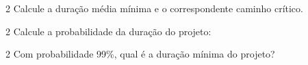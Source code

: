 \documentclass[\mainfilename]{subfiles}
\begin{document}
\begin{questionBox}
\begin{questionBox}
    \end{questionBox}

    \begin{questionBox}2{ %
        Calcule a duração média mínima e o correspondente caminho crítico.
    } %
    \end{questionBox}

    \begin{questionBox}2{ %
        Calcule a probabilidade da duração do projeto: 
    } %
    \end{questionBox}

    \begin{questionBox}2{ %
        Com probabilidade 99\%, qual é a duração mínima do projeto?
    } %
    \end{questionBox}

\end{questionBox}
\end{document}
